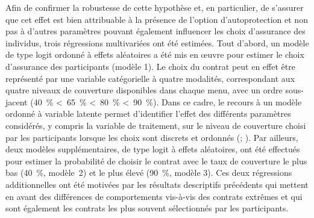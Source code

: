 \begin{Article}
\begin{refsection}[Mouminoux]
Afin de confirmer la robustesse de cette hypothèse et, en particulier, de s'assurer que cet effet est bien attribuable à la présence de l'option d'autoprotection et non pas à d'autres paramètres pouvant également influencer les choix d'assurance des individus, trois régressions multivariées ont été estimées. Tout d'abord, un modèle de type logit ordonné à effets aléatoires a été mis en \oe uvre pour estimer le choix d'assurance des participants (modèle 1). Le choix du contrat peut en effet être représenté par une variable catégorielle à quatre modalités, correspondant aux quatre niveaux de couverture disponibles dans chaque menu, avec un ordre sous-jacent (40~\% <~65~\% <~80~\% <~90~\%). Dans ce cadre, le recours à un modèle ordonné à variable latente permet d'identifier l'effet des différents paramètres considérés, y compris la variable de traitement, sur le niveau de couverture choisi par les participants lorsque les choix sont discrets et ordonnés (\textcite{ct05}; \textcite{g11}). Par ailleurs, deux modèles supplémentaires, de type logit à effets aléatoires, ont été effectués pour estimer la probabilité de choisir le contrat avec le taux de couverture le plus bas (40~\%, modèle~2) et le plus élevé (90~\%, modèle 3). Ces deux régressions additionnelles ont été motivées par les résultats descriptifs précédents qui mettent en avant des différences de comportements vis-à-vis des contrats extrêmes et qui sont également les contrats les plus souvent sélectionnés par les participants.


\end{refsection}
\end{Article}
